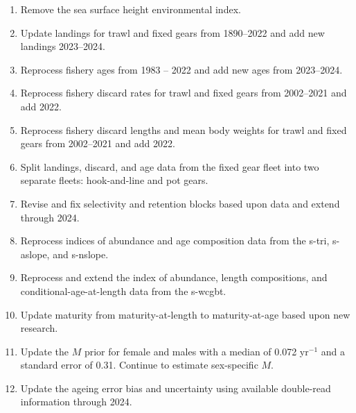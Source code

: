 \documentclass[
  english,
]{article}
\begin{document}
\begin{enumerate} 
\item Remove the sea surface height environmental index.
\item Update landings for trawl and fixed gears from 1890--2022 and add new landings 2023--2024.
\item Reprocess fishery ages from 1983 -- 2022 and add new ages from 2023--2024.
\item Reprocess fishery discard rates for trawl and fixed gears from 2002--2021 and add 2022.
\item Reprocess fishery discard lengths and mean body weights for trawl and fixed gears from 2002--2021 and add 2022.
\item Split landings, discard, and age data from the fixed gear fleet into two separate fleets: hook-and-line and pot gears.
\item Revise and fix selectivity and retention blocks based upon data and extend through 2024.
\item Reprocess indices of abundance and age composition data from the \gls{s-tri}, \gls{s-aslope}, and \gls{s-nslope}.
\item Reprocess and extend the index of abundance, length compositions, and conditional-age-at-length data from the \gls{s-wcgbt}. 
\item Update maturity from maturity-at-length to maturity-at-age based upon new research.
\item Update the $M$ prior for female and males with a median of 0.072 yr$^{-1}$ and a standard error of 0.31. Continue to estimate sex-specific $M$.
\item Update the ageing error bias and uncertainty using available double-read information through 2024.
\end{enumerate}
\end{document}

